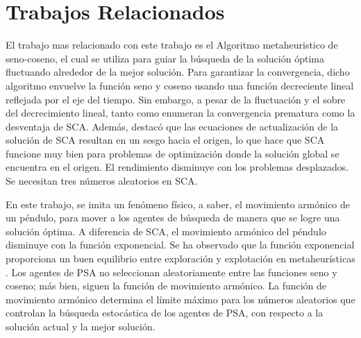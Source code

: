 \documentclass[conference]{IEEEtran}
\begin{document}
\section{Trabajos Relacionados}
\label{sec:TR}

El trabajo mas relacionado con este trabajo es el Algoritmo metaheuristico de
seno-coseno, el cual se utiliza para guiar la búsqueda de la solución
óptima fluctuando alrededor de la mejor solución. Para garantizar la
convergencia, dicho algoritmo envuelve la función seno y coseno usando una
función
decreciente lineal reflejada por el eje del tiempo. Sin embargo, a pesar de la
fluctuación y el sobre del decrecimiento lineal, tanto
\cite{abualigah2021advances} como \cite{gabis2021comprehensive} enumeran
la convergencia prematura como la desventaja de SCA. Además,
\cite{askari2020critical} destacó que
las ecuaciones de actualización de la solución de SCA resultan en un sesgo
hacia el origen, lo que hace que SCA funcione muy bien para problemas de
optimización donde la solución global se encuentra en el origen.
El rendimiento disminuye con los problemas desplazados. Se necesitan tres
números aleatorios en SCA.

En este trabajo, se imita un fenómeno físico, a saber, el movimiento armónico
de un péndulo, para mover a los agentes de búsqueda de manera que se logre una
solución óptima. A diferencia de SCA, el movimiento armónico del péndulo
disminuye con la función exponencial. Se ha observado que la función
exponencial proporciona un buen equilibrio entre exploración y explotación en
metaheurísticas \cite{aziz2018singlesolution, rahman2018singleagent}. Los
agentes de PSA no seleccionan aleatoriamente entre
las funciones seno y coseno; más bien, siguen la función de movimiento
armónico. La función de movimiento armónico determina el límite máximo para los
números aleatorios que controlan la búsqueda estocástica de los agentes de PSA,
con respecto a la solución actual y la mejor solución.
\end{document}
